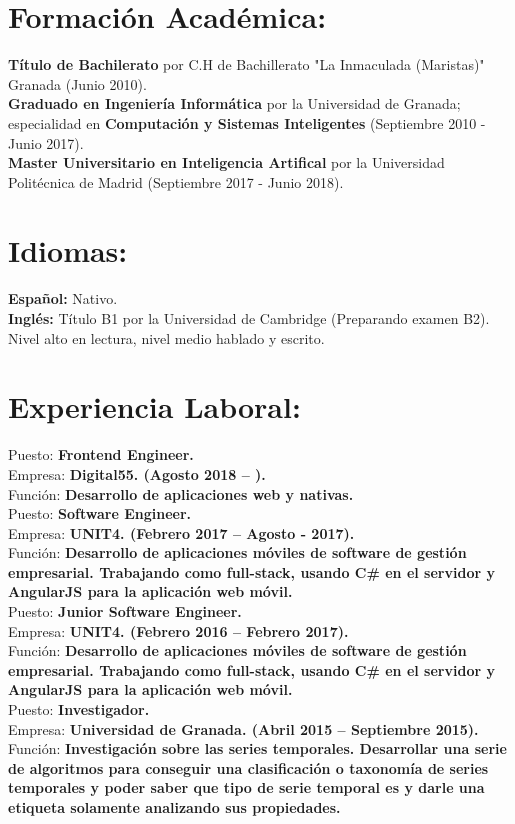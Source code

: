 \documentclass	[10pt,a4paper,oneside]{article}
\newcommand{\seccion}[1]{\vspace*{3mm}\section*{#1}\vspace*{-3mm}}
\begin{document}
\seccion{Formación Acad\'emica:}
\textbf{Título de Bachilerato} por C.H de Bachillerato "La Inmaculada (Maristas)" Granada (Junio 2010).\\
\textbf{Graduado en Ingenier\'ia Inform\'atica} por la Universidad de Granada;
especialidad en \textbf{Computación y Sistemas Inteligentes} (Septiembre 2010 - Junio 2017).\\
\textbf{Master Universitario en Inteligencia Artifical} por la Universidad Politécnica de Madrid (Septiembre 2017 - Junio 2018).\\


\seccion{Idiomas:}
\textbf{Español:} Nativo.\\
\textbf{Inglés:} Título B1 por la Universidad de Cambridge (Preparando examen B2). Nivel alto en lectura, nivel medio hablado y escrito.\\



\seccion{Experiencia Laboral:}

Puesto: \textbf{Frontend Engineer.}\\
Empresa: \textbf{Digital55. (Agosto 2018 – ).}\\
Función: \textbf{Desarrollo de aplicaciones web y nativas.}\\

Puesto: \textbf{Software Engineer.}\\
Empresa: \textbf{UNIT4. (Febrero 2017 – Agosto - 2017).}\\
Función: \textbf{Desarrollo de aplicaciones móviles de software de gestión empresarial. Trabajando como full-stack, usando C\# en el servidor y AngularJS para la aplicación web móvil.}\\

Puesto: \textbf{Junior Software Engineer.}\\
Empresa: \textbf{UNIT4. (Febrero 2016 – Febrero 2017).}\\
Función: \textbf{Desarrollo de aplicaciones móviles de software de gestión empresarial. Trabajando como full-stack, usando C\# en el servidor y AngularJS para la aplicación web móvil.}\\

Puesto: \textbf{Investigador.}\\
Empresa: \textbf{Universidad de Granada. (Abril 2015 – Septiembre 2015).}\\
Función: \textbf{Investigación sobre las series temporales. Desarrollar una serie de algoritmos para conseguir una clasificación o taxonomía de series temporales y poder saber que tipo de serie temporal es y darle una etiqueta solamente analizando sus propiedades.}\\
\end{document}
